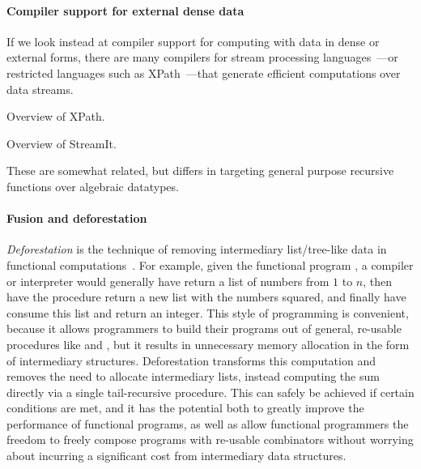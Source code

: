 \paragraph{Compiler support for external dense data}

If we look instead at compiler support for computing with data in dense or
external forms, there are many compilers for stream processing
languages~\cite{streamit,wavescript-nsdi}---or restricted languages such as
XPath~\cite{xpath-streams}---that generate efficient computations over data
streams.

Overview of XPath.

Overview of StreamIt.

These are somewhat related, but \ourcalc{} differs in targeting general
purpose recursive functions over algebraic datatypes.



%

\paragraph{Fusion and deforestation}

\emph{Deforestation} is the technique of removing intermediary list/tree-like
data in functional computations~\cite{wadler-deforestation}.
%
For example, given the functional program
, a compiler or interpreter would generally have
 return a list of numbers from $1$ to $n$, then have the 
procedure return a new list with the numbers squared, and finally have 
consume this list and return an integer. This style of programming is convenient,
because it allows programmers to build their programs out of general, re-usable
procedures like  and , but it results in unnecessary memory
allocation in the form of intermediary structures. Deforestation transforms
this computation and removes the need to allocate intermediary lists, instead
computing the sum directly via a single tail-recursive procedure. This can
safely be achieved if certain conditions are met, and it has the potential
both to greatly improve the performance of functional programs, as well as
allow functional programmers the freedom to freely compose programs with
re-usable combinators without worrying about incurring a significant cost
from intermediary data structures.

